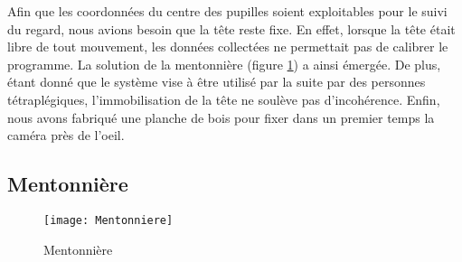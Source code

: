 Afin que les coordonnées du centre des pupilles soient exploitables pour le suivi du regard, nous avions besoin que la tête reste fixe. En effet, lorsque la tête était libre de tout mouvement, les données collectées ne permettait pas de calibrer le programme. La solution de la mentonnière (figure \ref{fig:Menton}) a ainsi émergée. De plus, étant donné que le système vise à être utilisé par la suite par des personnes tétraplégiques, l'immobilisation de la tête ne soulève pas d'incohérence.
Enfin, nous avons fabriqué une planche de bois pour fixer dans un premier temps la caméra près de l'oeil. 

\subsection{Mentonnière}
\begin{figure}[H]
  \centering
  \texttt{[image: Mentonniere]}
  \caption{Mentonnière}
  \label{fig:Menton}
\end{figure}